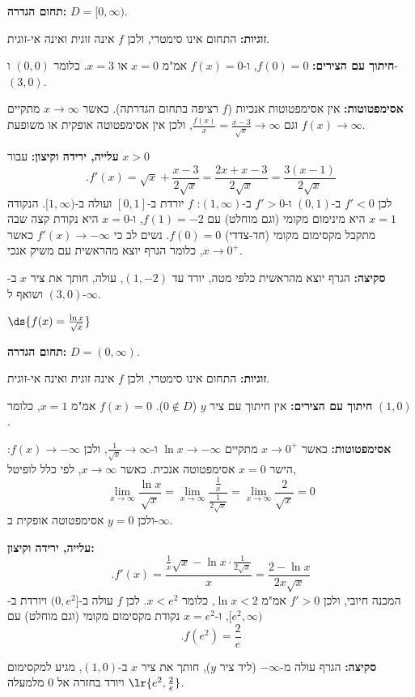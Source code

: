 \begin{solbox}
\unverified
\textbf{תחום הגדרה:}
$D=[0,\infty)$.

\textbf{זוגיות:}
התחום אינו סימטרי, ולכן
$f$
אינה זוגית ואינה אי-זוגית.

\textbf{חיתוך עם הצירים:}
$f(0)=0$,
ו-$f(x)=0$
אמ"מ
$x=0$
או
$x=3$.
כלומר
$(0,0)$
ו-$(3,0)$.

\textbf{אסימפטוטות:}
אין אסימפטוטות אנכיות
($f$
רציפה בתחום הגדרתה). כאשר
$x\to\infty$
מתקיים
$f(x)\to\infty$
וגם
$\frac{f(x)}{x}=\frac{x-3}{\sqrt x}\to\infty$,
ולכן אין אסימפטוטה אופקית או משופעת.

\textbf{עלייה, ירידה וקיצון:}
עבור
$x>0$
$$.f'(x)=\sqrt{x}+\frac{x-3}{2\sqrt{x}}=\frac{2x+x-3}{2\sqrt{x}}=\frac{3(x-1)}{2\sqrt{x}}$$
לכן
$f'<0$
ב-$(0,1)$
ו-$f'>0$
ב-$(1,\infty)$:
$f$
יורדת ב-$[0,1]$
ועולה ב-$[1,\infty)$.
הנקודה
$x=1$
היא מינימום מקומי (וגם מוחלט) עם
$f(1)=-2$,
ו-$x=0$
היא נקודת קצה שבה מתקבל מקסימום מקומי (חד-צדדי)
$f(0)=0$.
נשים לב כי
$f'(x)\to-\infty$
כאשר
$x\to0^+$,
כלומר הגרף יוצא מהראשית עם משיק אנכי.

\textbf{סקיצה:}
הגרף יוצא מהראשית כלפי מטה, יורד עד
$(1,-2)$,
עולה, חותך את ציר
$x$
ב-$(3,0)$
ושואף ל-$\infty$.
\end{solbox}
\item $\ds{f(x) = \frac{\ln x}{\sqrt{x}}}$
\begin{solbox}
\unverified
\textbf{תחום הגדרה:}
$D=(0,\infty)$.

\textbf{זוגיות:}
התחום אינו סימטרי, ולכן
$f$
אינה זוגית ואינה אי-זוגית.

\textbf{חיתוך עם הצירים:}
אין חיתוך עם ציר
$y$
($0\notin D$).
$f(x)=0$
אמ"מ
$x=1$,
כלומר
$(1,0)$.

\textbf{אסימפטוטות:}
כאשר
$x\to0^+$
מתקיים
$\ln x\to-\infty$
ו-$\frac{1}{\sqrt x}\to\infty$,
ולכן
$f(x)\to-\infty$:
הישר
$x=0$
אסימפטוטה אנכית. כאשר
$x\to\infty$,
לפי כלל לופיטל,
$$\lim_{x\to\infty}\frac{\ln x}{\sqrt{x}}=\lim_{x\to\infty}\frac{\frac1x}{\frac{1}{2\sqrt x}}=\lim_{x\to\infty}\frac{2}{\sqrt x}=0$$
ולכן
$y=0$
אסימפטוטה אופקית ב-$\infty$.

\textbf{עלייה, ירידה וקיצון:}
$$.f'(x)=\frac{\frac{1}{x}\sqrt{x}-\ln x\cdot\frac{1}{2\sqrt{x}}}{x}=\frac{2-\ln x}{2x\sqrt{x}}$$
המכנה חיובי, ולכן
$f'>0$
אמ"מ
$\ln x<2$,
כלומר
$x<e^2$.
לכן
$f$
עולה ב-$(0,e^2]$
ויורדת ב-$[e^2,\infty)$,
ו-$x=e^2$
נקודת מקסימום מקומי (וגם מוחלט) עם
$$.f(e^2)=\frac{2}{e}$$

\textbf{סקיצה:}
הגרף עולה מ-$-\infty$ (ליד ציר
$y$),
חותך את ציר
$x$
ב-$(1,0)$,
מגיע למקסימום
$\lr{e^2,\frac2e}$
ויורד בחזרה אל
$0$
מלמעלה.
\end{solbox}
